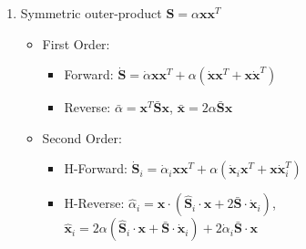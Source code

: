 \documentclass{article}
\newcommand{\vx}{\mathbf{x}}
\newcommand{\vxpi}{\dot{\mathbf{x}}_{i}}
\newcommand{\vxhi}{\hat{\mathbf{x}}_{i}}
\newcommand{\api}{\dot{\alpha}_{i}}
\newcommand{\ahi}{\hat{\alpha}_{i}}
\newcommand{\msb}{\bar{\mathbf{S}}}
\newcommand{\mspi}{\dot{\mathbf{S}}_{i}}
\newcommand{\mshi}{\hat{\mathbf{S}}_{i}}
\begin{document}
\begin{enumerate}
        \item Symmetric outer-product $\mathbf{S} = \alpha \mathbf{x}\mathbf{x}^{T}$
        \begin{itemize}
            \item First Order:
            \begin{itemize}
                \item Forward: $\dot{\mathbf{S}} = \dot{\alpha}  \mathbf{x}\mathbf{x}^{T} + \alpha( \dot{\mathbf{x}} \mathbf{x}^{T} + \mathbf{x} \dot{\mathbf{x}}^{T})$
                \item Reverse: $\bar{\alpha} = \mathbf{x}^{T} \bar{\mathbf{S}} \mathbf{x}$, $\bar{\mathbf{x}} = 2 \alpha \bar{\mathbf{S}} \mathbf{x}$
            \end{itemize}
            \item Second Order:
            \begin{itemize}
                \item H-Forward: $\mspi = \api \vx \vx^{T} + \alpha\left( \vxpi \vx^{T} + \vx \vxpi^T \right)$
                \item H-Reverse: $\ahi = \vx \cdot \left( \mshi \cdot \vx + 2 \msb \cdot \vxpi \right)$, $\vxhi = 2 \alpha \left( \mshi \cdot \vx + \msb \cdot \vxpi \right) + 2 \api \msb \cdot \vx$
            \end{itemize}
        \end{itemize}



    \end{enumerate}
\end{document}
